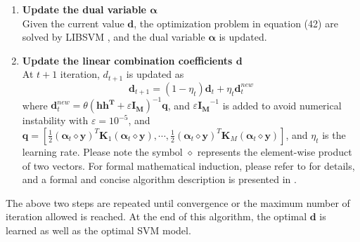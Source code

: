 \begin{enumerate}
	\item{\bf Update the dual variable $\boldsymbol{\alpha}$} \\
	Given the current value $\mathbf{d}$, the optimization problem in equation (42) are  solved by LIBSVM \cite{CC01a}, and the dual variable $\boldsymbol{\alpha}$ is updated.

	\item{\bf Update the linear combination coefficients $\mathbf{d}$}\\
	At $ t+1 $ iteration, $d_{t+1}$ is updated as
	\begin{equation}
	\mathbf{d}_{t+1} = (1 - \eta_t) \mathbf{d}_{t} + \eta_t \mathbf{d}_t^{new}
	\end{equation}
	where $\mathbf{d}_t^{new} = \theta(\mathbf{h h^T} + \varepsilon \mathbf{I_M})^{-1} \mathbf{q}$, and $\varepsilon \mathbf{I_M}^{-1}$ is added to avoid numerical instability with $\varepsilon = 10^{-5}$, and $\mathbf{q} = [\frac{1}{2}(\boldsymbol{\alpha}_t \diamond \mathbf{y})^T \mathbf{K}_1 (\boldsymbol{\alpha}_t \diamond \mathbf{y}), \cdots, \frac{1}{2}(\boldsymbol{\alpha}_t \diamond \mathbf{y})^T \mathbf{K}_M (\boldsymbol{\alpha}_t \diamond \mathbf{y})]$, and $\eta_t$ is the learning rate. Please note the symbol $\diamond$ represents the element-wise product of two vectors. For formal mathematical induction, please refer to \cite{duan2009domain,duan2012visual} for details, and a formal and concise algorithm description is presented in \cite{duan2012visual}. 
\end{enumerate}

\noindent The above two steps are repeated until convergence or the maximum number of iteration allowed is reached. At the end of this algorithm, the optimal $\mathbf{d}$ is learned as well as the optimal SVM model.

\noindent 
